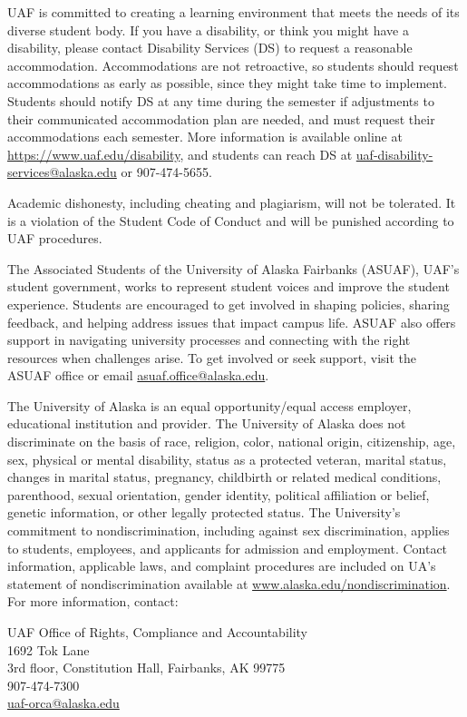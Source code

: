\documentclass[12pt]{article}
\def\mailto#1{\href{mailto:#1}{#1}}
\begin{document}
 UAF is committed to creating a learning environment that meets the needs of its diverse student body.  If you have a disability, or think you might have a disability, please contact Disability Services (DS) to request a reasonable accommodation.  Accommodations are not retroactive, so students should request accommodations as early as possible, since they might take time to implement.  Students should notify DS at any time during the semester if adjustments to their communicated accommodation plan are needed, and must request their accommodations each semester.  More information is available online at \url{https://www.uaf.edu/disability}, and students can reach DS at \mailto{uaf-disability-services@alaska.edu} or 907-474-5655.

Academic dishonesty, including cheating and plagiarism, will not
be tolerated.  It is a violation of the Student Code of Conduct
and will be punished according to UAF procedures.

 The Associated Students of the University of Alaska Fairbanks (ASUAF), UAF’s student government, works to represent student voices and improve the student experience. Students are encouraged to get involved in shaping policies, sharing feedback, and helping address issues that impact campus life. ASUAF also offers support in navigating university processes and connecting with the right resources when challenges arise. To get involved or seek support, visit the ASUAF office or email \mailto{asuaf.office@alaska.edu}. 

The University of Alaska is an equal opportunity/equal access employer, educational institution and provider. The University of Alaska does not discriminate on the basis of race, religion, color, national origin, citizenship, age, sex, physical or mental disability, status as a protected veteran, marital status, changes in marital status, pregnancy, childbirth or related medical conditions, parenthood, sexual orientation, gender identity, political affiliation or belief, genetic information, or other legally protected status. The University's commitment to nondiscrimination, including against sex discrimination, applies to students, employees, and applicants for admission and employment. Contact information, applicable laws, and complaint procedures are included on UA's statement of nondiscrimination available at \url{www.alaska.edu/nondiscrimination}.\\

For more information, contact: 

UAF Office of Rights, Compliance and Accountability\\
1692 Tok Lane\\
3rd floor, Constitution Hall, Fairbanks, AK 99775\\
907-474-7300\\
\mailto{uaf-orca@alaska.edu}\\


\end{document}
